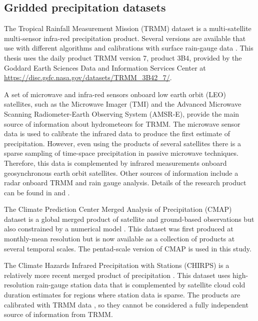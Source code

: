 \subsection{Gridded precipitation datasets}

The Tropical Rainfall Measurement Mission (TRMM) dataset is a multi-satellite multi-sensor infra-red precipitation product. Several versions are available that use with different algorithms and calibrations with surface rain-gauge data \citep{huffman2007}. This thesis uses the daily product TRMM version 7, product 3B4, provided by the Goddard Earth Sciences Data and Information Services Center \citep{mission2011trmm} at \url{https://disc.gsfc.nasa.gov/datasets/TRMM_3B42_7/}.

 A set of microwave and infra-red sensors onboard low earth orbit (LEO) satellites, such as the Microwave Imager (TMI) and the Advanced Microwave Scanning Radiometer-Earth Observing System (AMSR-E), provide the main source of information about hydrometeors for TRMM. The microwave sensor data is used to calibrate the infrared data to produce the first estimate of precipitation. However, even using the products of several satellites there is a sparse sampling of time-space precipitation  in passive microwave techniques. Therefore, this data is complemented by infrared measurements onboard geosynchronous earth orbit satellites. Other sources of information include a radar onboard TRMM and rain gauge analysis. Details of the research product can be found in \cite{huffman2007} and \cite{mission2011}.

The Climate Prediction Center Merged Analysis of Precipitation (CMAP) dataset is a global merged product of satellite and ground-based observations but also constrained by a numerical model \citep{Xie2007}. This dataset was first produced at monthly-mean resolution \citep{xie1997} but is now available as a collection of products at several temporal scales. The pentad-scale version of CMAP is used in this study. %

The Climate Hazards Infrared Precipitation with Stations (CHIRPS) is a relatively more recent merged product of precipitation \citep{funk2015}. This dataset uses high-resolution rain-gauge station data that is complemented by satellite cloud cold duration estimates for regions where station data is sparse. The products are calibrated with TRMM data \citep{funk2015}, so they cannot be considered a fully independent source of information from TRMM.

